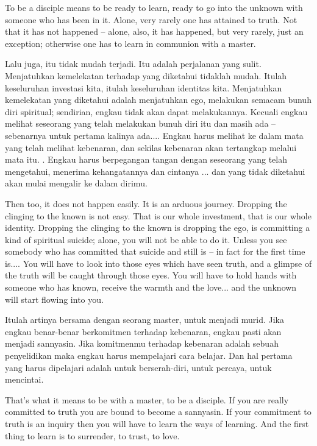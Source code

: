 \english
To be a disciple means to be ready to learn, ready to go into the unknown with someone who has been in it. Alone, very rarely one has attained to truth. Not that it has not happened -- alone, also, it has happened, but very rarely, just an exception; otherwise one has to learn in communion with a master.

\bahasa
Lalu juga, itu tidak mudah terjadi. Itu adalah perjalanan yang sulit. Menjatuhkan kemelekatan terhadap yang diketahui tidaklah mudah. Itulah keseluruhan investasi kita, itulah keseluruhan identitas kita. Menjatuhkan kemelekatan yang diketahui adalah menjatuhkan ego, melakukan semacam bunuh diri spiritual; sendirian, engkau tidak akan dapat melakukannya. Kecuali engkau melihat seseorang yang telah melakukan bunuh diri itu dan masih ada -- sebenarnya untuk pertama kalinya ada.... Engkau harus melihat ke dalam mata yang telah melihat kebenaran, dan sekilas kebenaran akan tertangkap melalui mata itu. . Engkau harus berpegangan tangan dengan seseorang yang telah mengetahui, menerima kehangatannya dan cintanya ... dan yang tidak diketahui akan mulai mengalir ke dalam dirimu.

\english
Then too, it does not happen easily. It is an arduous journey. Dropping the clinging to the known is not easy. That is our whole investment, that is our whole identity. Dropping the clinging to the known is dropping the ego, is committing a kind of spiritual suicide; alone, you will not be able to do it. Unless you see somebody who has committed that suicide and still is -- in fact for the first time is.... You will have to look into those eyes which have seen truth, and a glimpse of the truth will be caught through those eyes. You will have to hold hands with someone who has known, receive the warmth and the love... and the unknown will start flowing into you.

\bahasa
Itulah artinya bersama dengan seorang master, untuk menjadi murid. Jika engkau benar-benar berkomitmen terhadap kebenaran, engkau pasti akan menjadi sannyasin. Jika komitmenmu terhadap kebenaran adalah sebuah penyelidikan maka engkau harus mempelajari cara belajar. Dan hal pertama yang harus dipelajari adalah untuk berserah-diri, untuk percaya, untuk mencintai.

\english
That's what it means to be with a master, to be a disciple. If you are really committed to truth you are bound to become a sannyasin. If your commitment to truth is an inquiry then you will have to learn the ways of learning. And the first thing to learn is to surrender, to trust, to love.

